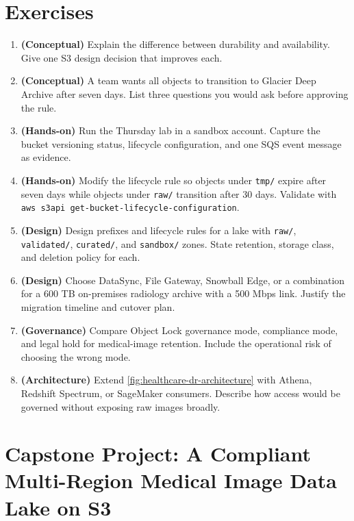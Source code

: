 \section{Exercises}
\begin{enumerate}
    \item \textbf{(Conceptual)} Explain the difference between durability and availability. Give one S3 design decision that improves each.
    \item \textbf{(Conceptual)} A team wants all objects to transition to Glacier Deep Archive after seven days. List three questions you would ask before approving the rule.
    \item \textbf{(Hands-on)} Run the Thursday lab in a sandbox account. Capture the bucket versioning status, lifecycle configuration, and one SQS event message as evidence.
    \item \textbf{(Hands-on)} Modify the lifecycle rule so objects under \texttt{tmp/} expire after seven days while objects under \texttt{raw/} transition after 30 days. Validate with \texttt{aws s3api get-bucket-lifecycle-configuration}.
    \item \textbf{(Design)} Design prefixes and lifecycle rules for a lake with \texttt{raw/}, \texttt{validated/}, \texttt{curated/}, and \texttt{sandbox/} zones. State retention, storage class, and deletion policy for each.
    \item \textbf{(Design)} Choose DataSync, File Gateway, Snowball Edge, or a combination for a 600 TB on-premises radiology archive with a 500 Mbps link. Justify the migration timeline and cutover plan.
    \item \textbf{(Governance)} Compare Object Lock governance mode, compliance mode, and legal hold for medical-image retention. Include the operational risk of choosing the wrong mode.
    \item \textbf{(Architecture)} Extend \cref{fig:healthcare-dr-architecture} with Athena, Redshift Spectrum, or SageMaker consumers. Describe how access would be governed without exposing raw images broadly.
\end{enumerate}

\section{Capstone Project: A Compliant Multi-Region Medical Image Data Lake on S3}\label{sec:ch1-capstone}

